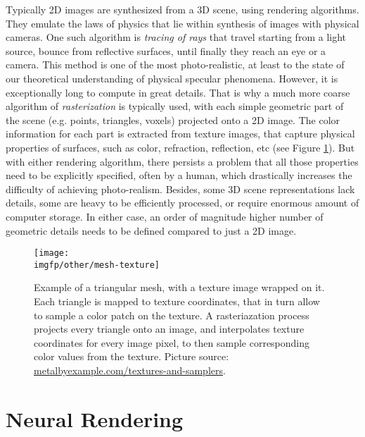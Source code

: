 Typically 2D images are synthesized from a 3D scene, using rendering algorithms. They emulate the laws of physics that lie within synthesis of images with physical cameras. One such algorithm is \textit{tracing of rays} that travel starting from a light source, bounce from reflective surfaces, until finally they reach an eye or a camera. This method is one of the most photo-realistic, at least to the state of our theoretical understanding of physical specular phenomena. However, it is exceptionally long to compute in great details. That is why a much more coarse algorithm of \textit{rasterization} is typically used, with each simple geometric part of the scene (e.g. points, triangles, voxels) projected onto a 2D image. The color information for each part is extracted from texture images, that capture physical properties of surfaces, such as color, refraction, reflection, etc (see Figure \ref{intro:fig:mesh-texture}). But with either rendering algorithm, there persists a problem that all those properties need to be explicitly specified, often by a human, which drastically increases the difficulty of achieving photo-realism. Besides, some 3D scene representations lack details, some are heavy to be efficiently processed, or require enormous amount of computer storage. In either case, an order of magnitude higher number of geometric details needs to be defined compared to just a 2D image. 

\begin{figure}[h!]
	\centering
	\texttt{[image: \\imgfp/other/mesh-texture]}
	\caption{Example of a triangular mesh, with a texture image wrapped on it. Each triangle is mapped to texture coordinates, that in turn allow to sample a color patch on the texture. A rasteriazation process projects every triangle onto an image, and interpolates texture coordinates for every image pixel, to then sample corresponding color values from the texture. Picture source: \href{https://metalbyexample.com/textures-and-samplers/}{metalbyexample.com/textures-and-samplers}.}
	\label{intro:fig:mesh-texture}
\end{figure}


\section{Neural Rendering}\label{intro:nrender}

